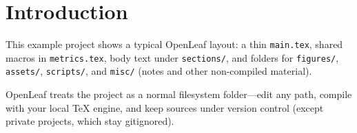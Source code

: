\section{Introduction}
\label{sec:intro}

This example project shows a typical OpenLeaf layout: a thin \texttt{main.tex},
shared macros in \texttt{metrics.tex}, body text under \texttt{sections/}, and
folders for \texttt{figures/}, \texttt{assets/}, \texttt{scripts/}, and
\texttt{misc/} (notes and other non-compiled material).

OpenLeaf treats the project as a normal filesystem folder---edit any path,
compile with your local TeX engine, and keep sources under version control
(except private projects, which stay gitignored).
